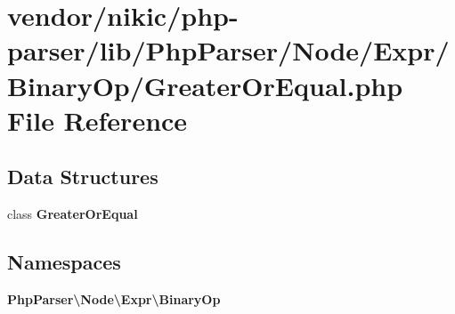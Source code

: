\section{vendor/nikic/php-\/parser/lib/\+Php\+Parser/\+Node/\+Expr/\+Binary\+Op/\+Greater\+Or\+Equal.php File Reference}
\label{_greater_or_equal_8php}
\subsection*{Data Structures}
\begin{DoxyCompactItemize}
\item 
class {\bf Greater\+Or\+Equal}
\end{DoxyCompactItemize}
\subsection*{Namespaces}
\begin{DoxyCompactItemize}
\item 
 {\bf Php\+Parser\textbackslash{}\+Node\textbackslash{}\+Expr\textbackslash{}\+Binary\+Op}
\end{DoxyCompactItemize}
